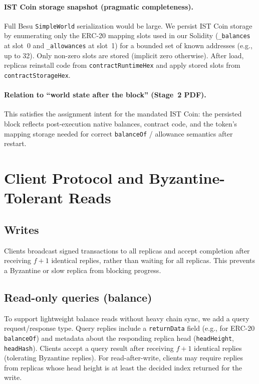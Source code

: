 \documentclass[runningheads]{llncs}
\begin{document}
\paragraph{IST Coin storage snapshot (pragmatic completeness).}
Full Besu \texttt{SimpleWorld} serialization would be large. We persist IST Coin storage by enumerating only the ERC-20 mapping slots used in our Solidity
(\texttt{\_balances} at slot~0 and \texttt{\_allowances} at slot~1) for a bounded set of known addresses (e.g., up to 32). Only non-zero slots are stored
(implicit zero otherwise). After load, replicas reinstall code from \texttt{contractRuntimeHex} and apply stored slots from \texttt{contractStorageHex}.

\paragraph{Relation to ``world state after the block'' (Stage~2 PDF).}
This satisfies the assignment intent for the mandated IST Coin: the persisted block reflects post-execution native balances, contract code,
and the token's mapping storage needed for correct \texttt{balanceOf} / allowance semantics after restart.

\section{Client Protocol and Byzantine-Tolerant Reads}
\subsection{Writes}
Clients broadcast signed transactions to all replicas and accept completion after receiving $f{+}1$ identical replies, rather than waiting for all replicas.
This prevents a Byzantine or slow replica from blocking progress.

\subsection{Read-only queries (balance)}
To support lightweight balance reads without heavy chain sync, we add a query request/response type.
Query replies include a \texttt{returnData} field (e.g., for ERC-20 \texttt{balanceOf}) and metadata about the responding replica head
(\texttt{headHeight}, \texttt{headHash}).
Clients accept a query result after receiving $f{+}1$ identical replies (tolerating Byzantine replies).
For read-after-write, clients may require replies from replicas whose head height is at least the decided index returned for the write.
\end{document}

